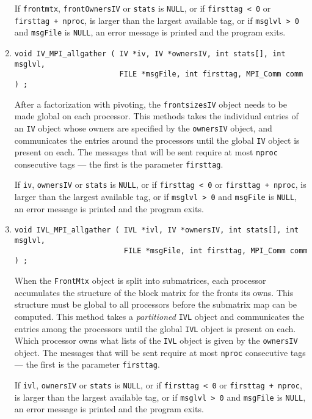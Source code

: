 \begin{enumerate}
If {\tt frontmtx}, {\tt frontOwnersIV} or {\tt stats} is {\tt NULL}, 
or if {\tt firsttag < 0} or {\tt firsttag + nproc},
is larger than the largest available tag,
or if {\tt msglvl > 0} and {\tt msgFile} is {\tt NULL},
an error message is printed and the program exits.
\item
\begin{verbatim}
void IV_MPI_allgather ( IV *iv, IV *ownersIV, int stats[], int msglvl, 
                        FILE *msgFile, int firsttag, MPI_Comm comm ) ;
\end{verbatim}
After a factorization with pivoting, the {\tt frontsizesIV} object
needs to be made global on each processor.
This methods takes the individual entries of an {\tt IV} object
whose owners are specified by the {\tt ownersIV} object, and
communicates the entries around the processors until the global
{\tt IV} object is present on each.
The messages that will be sent require at most {\tt nproc} 
consecutive tags --- the first is the parameter {\tt firsttag}.
\par {}
If {\tt iv}, {\tt ownersIV} or {\tt stats} is {\tt NULL}, 
or if {\tt firsttag < 0} or {\tt firsttag + nproc},
is larger than the largest available tag,
or if {\tt msglvl > 0} and {\tt msgFile} is {\tt NULL},
an error message is printed and the program exits.
\item
\begin{verbatim}
void IVL_MPI_allgather ( IVL *ivl, IV *ownersIV, int stats[], int msglvl, 
                         FILE *msgFile, int firsttag, MPI_Comm comm ) ;
\end{verbatim}
When the {\tt FrontMtx} object is split into submatrices, each
processor accumulates the structure of the block matrix for the
fronts its owns. 
This structure must be global to all processors before the
submatrix map can be computed.
This method takes a {\it partitioned} {\tt IVL} object and
communicates the entries among the processors until the global
{\tt IVL} object is present on each.
Which processor owns what lists of the {\tt IVL} object is given by
the {\tt ownersIV} object.
The messages that will be sent require at most {\tt nproc} 
consecutive tags --- the first is the parameter {\tt firsttag}.
\par {}
If {\tt ivl}, {\tt ownersIV} or {\tt stats} is {\tt NULL}, 
or if {\tt firsttag < 0} or {\tt firsttag + nproc},
is larger than the largest available tag,
or if {\tt msglvl > 0} and {\tt msgFile} is {\tt NULL},
an error message is printed and the program exits.
\end{enumerate}
\par
